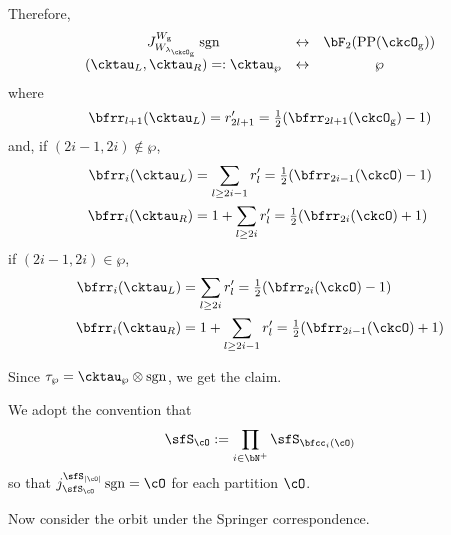 \documentclass[12pt]{amsart}
\def\abs#1{\left|{#1}\right|}
\newcommand{\sgn}{\operatorname{sgn}}
\numberwithin{equation}{section}
\theoremstyle{remark}
\def\half{{\tfrac{1}{2}}}
\def\lamckg{\lambda_{\ckcO_{\mathrm g}}}
\def\CPP{\mathrm{PP}}
\begin{document}
{{      Therefore,
      \[
        \begin{array}{ccc}
          J_{W_{\lamckg}}^{W_{\mathrm g}} \sgn
          &\leftrightarrow&  \bF_{2}(\CPP(\ckcO_{\mathrm g}))\\
          (\cktau_{L},\cktau_{R}) =:\cktau_{\wp}&\leftrightarrow & \wp
        \end{array}
      \]
      where
      \[
        \bfrr_{l+1}(\cktau_{L}) = r'_{2l+1} = \half (\bfrr_{2l+1}(\ckcO_{\mathrm g})-1)
      \]
      and, if $(2i-1,2i)\notin \wp$,
      \[
        \begin{split}
          \bfrr_{i}(\cktau_{L}) & = \sum_{l\geq 2i-1} r'_{l}
          = \half(\bfrr_{2i-1}(\ckcO)-1)\\
          \bfrr_{i}(\cktau_{R}) & = 1 + \sum_{l\geq 2i} r'_{l} = \half(\bfrr_{2i}(\ckcO)+1)
        \end{split}
      \]
      if $(2i-1,2i)\in \wp$,
      \[
        \begin{split}
          \bfrr_{i}(\cktau_{L}) & = \sum_{l\geq 2i} r'_{l}
          = \half(\bfrr_{2i}(\ckcO)-1)\\
          \bfrr_{i}(\cktau_{R}) & = 1 + \sum_{l\geq 2i-1} r'_{l} = \half(\bfrr_{2i-1}(\ckcO)+1)
        \end{split}
      \]


      Since $\tau_{\wp} = \cktau_{\wp}\otimes \sgn$, we get the claim.

      We adopt the convention that
      \[
        \sfS_{\cO} := \prod_{i\in \bN^{+}}\sfS_{\bfcc_{i}(\cO)}
      \]
      so that $j_{\sfS_{\cO}}^{\sfS_{\abs{\cO}}}\sgn = \cO$ for each partition
      $\cO$.

      Now consider the orbit under the Springer correspondence.

}}
\end{document}
